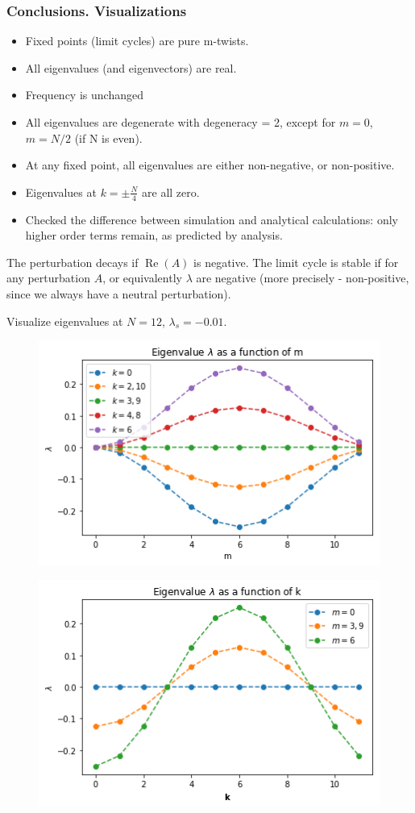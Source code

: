 \documentclass[a4paper,10pt]{article}
\renewcommand*{\Re}{\operatorname{Re}}
\begin{document}
\subsubsection{Conclusions. Visualizations}
\begin{itemize}
\item Fixed points (limit cycles) are pure m-twists.
\item All eigenvalues (and eigenvectors) are real.
\item Frequency is unchanged
\item All eigenvalues are degenerate with degeneracy = 2, except for $m=0$, $m=N / 2$ (if N is even).
\item At any fixed point, all eigenvalues are either non-negative, or non-positive.
\item Eigenvalues at $k=\pm\frac{N}{4}$  are all zero.
\item Checked the difference between simulation and analytical calculations: only higher order terms remain, as predicted by analysis.

\end{itemize}

The perturbation decays if $\Re(A)$ is negative. The limit cycle is stable if for any perturbation $A$, or equivalently $\lambda$ are negative (more precisely - non-positive, since we always have a neutral perturbation).


Visualize eigenvalues at $N=12$, $\lambda_s = - 0.01$. 


\begin{figure}[h]
    \centering
    \includegraphics[width=.6\textwidth]{assets/theory-2019-08-27-181128169-abc.png}
\end{figure}

\begin{figure}[h]
    \centering
    \includegraphics[width=.6\textwidth]{assets/theory-2019-08-27-181132121-3da.png}
\end{figure}
\end{document}
